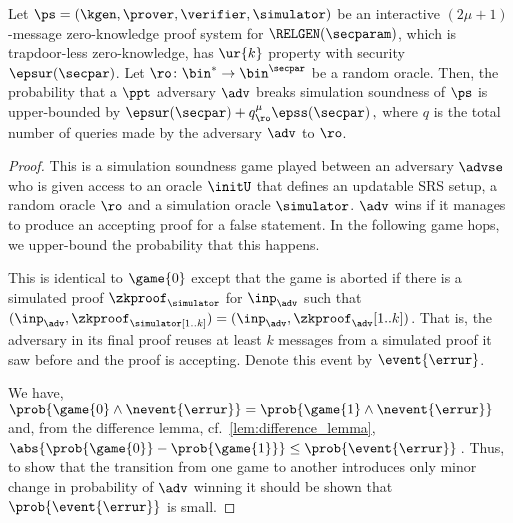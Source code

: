 \begin{theorem}
	\label{thm:simsnd}
	Let $\ps = (\kgen, \prover, \verifier, \simulator)$ be an interactive $(2 \mu + 1)$-message
	zero-knowledge proof system for $\RELGEN(\secparam)$, which is trapdoor-less zero-knowledge, has
	$\ur{k}$ property with security $\epsur(\secpar)$. Let $\ro\colon \bin^{*} \to \bin^{\secpar}$ be a random oracle. Then, the
	probability that a $\ppt$ adversary $\adv$ breaks simulation soundness of
	$\ps$ is upper-bounded by
	\(
	\epsur(\secpar) + q_\ro^\mu  \epss(\secpar)\,,
	\)
	where $q$ is the total number of queries made by the adversary $\adv$ to $\ro$.
\end{theorem}

\begin{proof}
	 This is a simulation soundness game played between an adversary
	$\advse$ who is given access to an oracle $\initU$ that defines an updatable SRS setup, a random oracle $\ro$ and a simulation oracle
	$\simulator$. $\adv$ wins if it manages to produce an accepting proof
	for a false statement. In the following game hops, we upper-bound the
	probability that this happens.
	
	 This is identical to $\game{0}$ except that the game is aborted if
	there is a simulated proof $\zkproof_\simulator$ for $\inp_{\adv}$ such that
	$(\inp_{\adv}, \zkproof_\simulator[1..k]) = (\inp_{\adv},
	\zkproof_{\adv}[1..k])$. That is, the adversary in its final proof reuses at
	least $k$ messages from a simulated proof it saw before and the proof is
	accepting.  Denote this event by $\event{\errur}$.
	
	 We have, \( \prob{\game{0} \land
		\nevent{\errur}} = \prob{\game{1} \land \nevent{\errur}} \) and, from the
	difference lemma, cf.~\cref{lem:difference_lemma},
	$ \abs{\prob{\game{0}} - \prob{\game{1}}} \leq \prob{\event{\errur}}\,$.
	Thus, to show that the transition from one game to another introduces only
	minor change in probability of $\adv$ winning it should be shown that
	$\prob{\event{\errur}}$ is small.
	

\end{proof}
